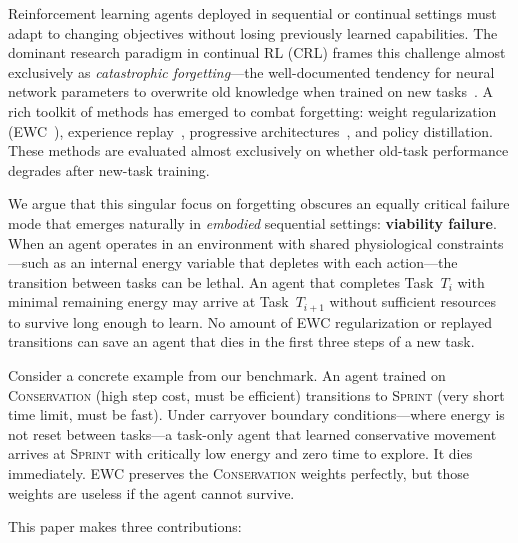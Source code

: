 \documentclass{article}
\begin{document}
Reinforcement learning agents deployed in sequential or continual settings
must adapt to changing objectives without losing previously learned capabilities.
The dominant research paradigm in continual RL (CRL) frames this challenge
almost exclusively as \emph{catastrophic forgetting}—the well-documented
tendency for neural network parameters to overwrite old knowledge when trained
on new tasks~\cite{Parisi2019,kirkpatrick2017,continualworld2021}. A rich
toolkit of methods has emerged to combat forgetting: weight regularization
(EWC~\cite{kirkpatrick2017}), experience replay~\cite{rolnick2019}, progressive
architectures~\cite{rusu2016}, and policy distillation. These methods are
evaluated almost exclusively on whether old-task performance degrades after
new-task training.

We argue that this singular focus on forgetting obscures an equally critical
failure mode that emerges naturally in \emph{embodied} sequential settings:
\textbf{viability failure}. When an agent operates in an environment with
shared physiological constraints—such as an internal energy variable that
depletes with each action—the transition between tasks can be lethal. An agent
that completes Task~$T_i$ with minimal remaining energy may arrive at
Task~$T_{i+1}$ without sufficient resources to survive long enough to learn.
No amount of EWC regularization or replayed transitions can save an agent
that dies in the first three steps of a new task.

Consider a concrete example from our benchmark. An agent trained on
\textsc{Conservation} (high step cost, must be efficient) transitions to
\textsc{Sprint} (very short time limit, must be fast). Under carryover
boundary conditions—where energy is not reset between tasks—a task-only
agent that learned conservative movement arrives at \textsc{Sprint} with
critically low energy and zero time to explore. It dies immediately. EWC
preserves the \textsc{Conservation} weights perfectly, but those weights
are useless if the agent cannot survive.

This paper makes three contributions:
\end{document}
